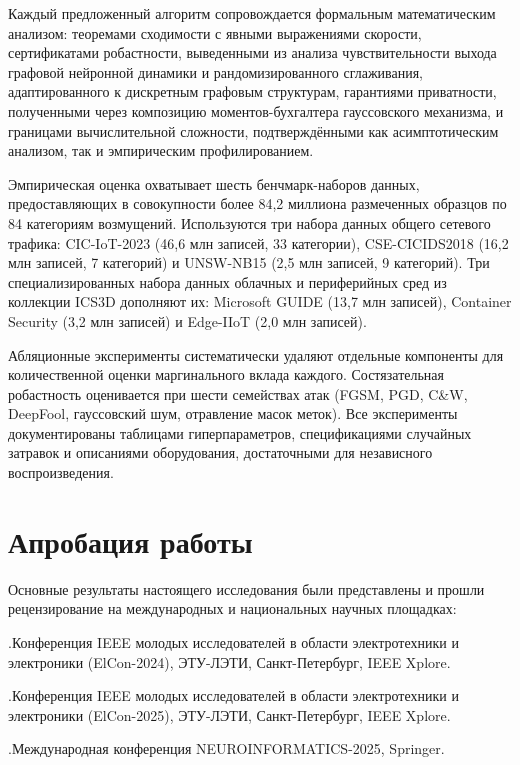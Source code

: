 Каждый предложенный алгоритм сопровождается формальным математическим анализом: теоремами сходимости с явными выражениями скорости, сертификатами робастности, выведенными из анализа чувствительности выхода графовой нейронной динамики и рандомизированного сглаживания, адаптированного к дискретным графовым структурам, гарантиями приватности, полученными через композицию моментов-бухгалтера гауссовского механизма, и границами вычислительной сложности, подтверждёнными как асимптотическим анализом, так и эмпирическим профилированием.

Эмпирическая оценка охватывает шесть бенчмарк-наборов данных, предоставляющих в совокупности более 84,2 миллиона размеченных образцов по 84 категориям возмущений. Используются три набора данных общего сетевого трафика: CIC-IoT-2023 (46,6 млн записей, 33 категории), CSE-CICIDS2018 (16,2 млн записей, 7 категорий) и UNSW-NB15 (2,5 млн записей, 9 категорий). Три специализированных набора данных облачных и периферийных сред из коллекции ICS3D дополняют их: Microsoft GUIDE (13,7 млн записей), Container Security (3,2 млн записей) и Edge-IIoT (2,0 млн записей).

Абляционные эксперименты систематически удаляют отдельные компоненты для количественной оценки маргинального вклада каждого. Состязательная робастность оценивается при шести семействах атак (FGSM, PGD, C\&W, DeepFool, гауссовский шум, отравление масок меток). Все эксперименты документированы таблицами гиперпараметров, спецификациями случайных затравок и описаниями оборудования, достаточными для независного воспроизведения.


\section*{Апробация работы}

Основные результаты настоящего исследования были представлены и прошли рецензирование на международных и национальных научных площадках:

.\quad Конференция IEEE молодых исследователей в области электротехники и электроники (ElCon-2024), ЭТУ-ЛЭТИ, Санкт-Петербург, IEEE Xplore.

.\quad Конференция IEEE молодых исследователей в области электротехники и электроники (ElCon-2025), ЭТУ-ЛЭТИ, Санкт-Петербург, IEEE Xplore.

.\quad Международная конференция NEUROINFORMATICS-2025, Springer.

